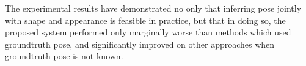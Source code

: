 The experimental results have demonstrated no only that inferring pose  
jointly with shape and appearance is feasible in practice, but that in doing so, the proposed system performed only marginally worse than methods which used groundtruth pose, and significantly improved on other approaches when groundtruth pose is not known.



